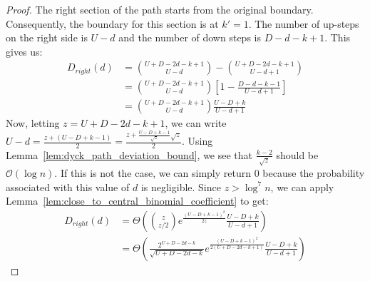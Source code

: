 \ReturnDRightBound*
\begin{proof}
The right section of the path starts from the original boundary.
Consequently, the boundary for this section is at $k' = 1$.
The number of up-steps on the right side is $U-d$ and the number of down steps is $D-d-k+1$.
This gives us:
\begin{align}
D_{right}(d) &= \binom{U+D-2d-k+1}{U-d} - \binom{U+D-2d-k+1}{U-d+1}\\
&= \binom{U+D-2d-k+1}{U-d}\left[ 1-\frac{D-d-k-1}{U-d+1}\right]\\
&= \binom{U+D-2d-k+1}{U-d}\frac{U-D+k}{U-d+1}
\end{align}
Now, letting $z = U+D-2d-k+1$,  we can write $U-d = \frac{z+(U-D+k-1)}{2} = \frac{z+\frac{U-D+k-1}{\sqrt z}\sqrt z}{2}$.
Using Lemma~\ref{lem:dyck_path_deviation_bound}, we see that $\frac{k-2}{\sqrt z}$ should be $\mathcal O(\log n)$.
If this is not the case, we can simply return $0$ because the probability associated with this value of $d$ is negligible.
Since $z > \log^7 n$, we can apply Lemma~\ref{lem:close_to_central_binomial_coefficient} to get:
\begin{align}
D_{right}(d) &= \Theta\left( \binom{z}{z/2} e^{\frac{(U-D+k-1)^2}{2z}} \frac{U-D+k}{U-d+1} \right)\\
&= \Theta\left( \frac{2^{U+D-2d-k}}{\sqrt{U+D-2d-k}} e^{\frac{(U-D+k-1)^2}{2(U+D-2d-k+1)}} \frac{U-D+k}{U-d+1} \right)
\end{align}
\end{proof}

